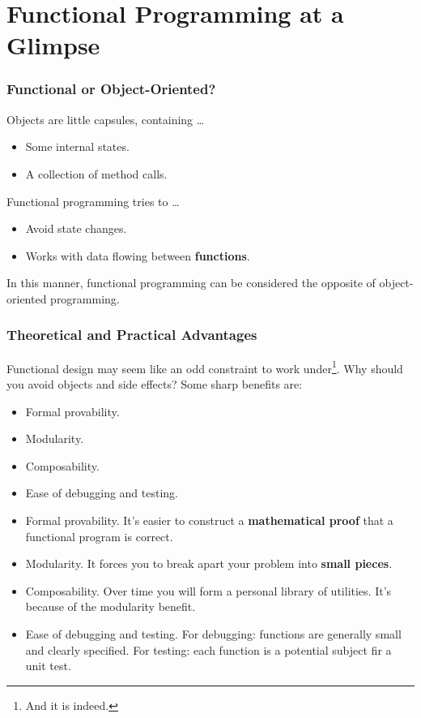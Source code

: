 \documentclass[12pt,hyperref=true,mathserif]{beamer}
\begin{document}
\section{Functional Programming at a Glimpse}


\begin{frame}
  \frametitle{Functional or Object-Oriented?}
  Objects are little capsules, containing \ldots
  \begin{itemize}
    \item Some internal states.
    \item A collection of method calls.\\[6pt]
  \end{itemize}
  Functional programming tries to \ldots
  \begin{itemize}
    \item Avoid state changes.
    \item Works with data flowing between \textbf{functions}.\\[4pt]
  \end{itemize}
  In this manner, functional programming can be considered the
  opposite of object-oriented programming.
\end{frame}


\begin{frame}
  \frametitle{Theoretical and Practical Advantages}
Functional design may seem like an odd constraint to work
under\footnote{And it is indeed.}. Why should you avoid objects and
side effects? Some sharp benefits are:
\begin{itemize}
  \item Formal provability.\\[4pt]
  \item Modularity.\\[4pt]
  \item Composability.\\[4pt]
  \item Ease of debugging and testing.\\[4pt]
\end{itemize}
\end{frame}

\begin{frame}
  \begin{itemize}
    \item Formal provability. It's easier to construct a
      \textbf{mathematical proof} that a functional program is correct.\\[4pt]
    \item Modularity. It forces you to break apart your problem into
      \textbf{small pieces}.\\[4pt]
    \item Composability. Over time you will form a personal library of
      utilities. It's because of the modularity benefit.\\[4pt]
    \item Ease of debugging and testing. For debugging: functions are
      generally small and clearly specified. For testing: each
      function is a potential subject fir a unit test.
  \end{itemize}
\end{frame}
\end{document}
